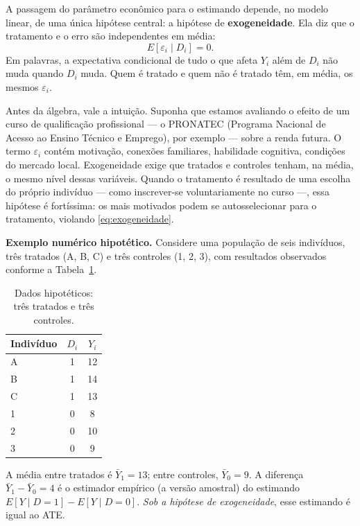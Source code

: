 A passagem do parâmetro econômico para o estimando depende, no modelo linear, de uma única hipótese central: a hipótese de \textbf{exogeneidade}. Ela diz que o tratamento e o erro são independentes em média:
\begin{equation}
E[\varepsilon_i \mid D_i] = 0.
\label{eq:exogeneidade}
\end{equation}
Em palavras, a expectativa condicional de tudo o que afeta $Y_i$ além de $D_i$ não muda quando $D_i$ muda. Quem é tratado e quem não é tratado têm, em média, os mesmos $\varepsilon_i$.

Antes da álgebra, vale a intuição. Suponha que estamos avaliando o efeito de um curso de qualificação profissional --- o PRONATEC (Programa Nacional de Acesso ao Ensino Técnico e Emprego), por exemplo --- sobre a renda futura. O termo $\varepsilon_i$ contém motivação, conexões familiares, habilidade cognitiva, condições do mercado local. Exogeneidade exige que tratados e controles tenham, na média, o mesmo nível dessas variáveis. Quando o tratamento é resultado de uma escolha do próprio indivíduo --- como inscrever-se voluntariamente no curso ---, essa hipótese é fortíssima: os mais motivados podem se autosselecionar para o tratamento, violando \eqref{eq:exogeneidade}.

\textbf{Exemplo numérico hipotético.} Considere uma população de seis indivíduos, três tratados (A, B, C) e três controles (1, 2, 3), com resultados observados conforme a Tabela~\ref{tab:exemplo-binario}.

\begin{table}[h]
\centering
\begin{tabular}{lcc}
\toprule
Indivíduo & $D_i$ & $Y_i$ \\
\midrule
A & 1 & 12 \\
B & 1 & 14 \\
C & 1 & 13 \\
1 & 0 & 8 \\
2 & 0 & 10 \\
3 & 0 & 9 \\
\bottomrule
\end{tabular}
\caption{Dados hipotéticos: três tratados e três controles.}
\label{tab:exemplo-binario}
\end{table}

A média entre tratados é $\bar{Y}_1 = 13$; entre controles, $\bar{Y}_0 = 9$. A diferença $\bar{Y}_1 - \bar{Y}_0 = 4$ é o estimador empírico (a versão amostral) do estimando $E[Y \mid D=1] - E[Y \mid D=0]$. \textit{Sob a hipótese de exogeneidade}, esse estimando é igual ao ATE.

